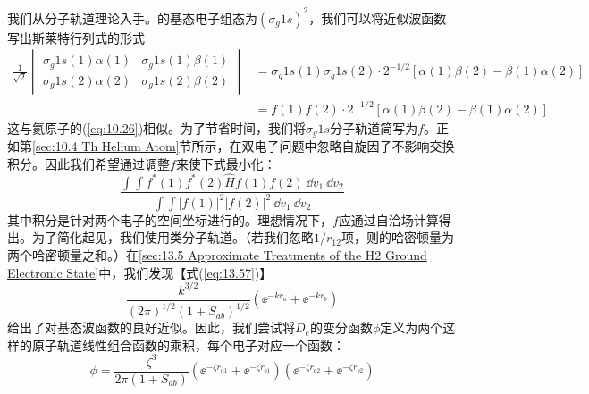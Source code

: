     我们从分子轨道理论入手。的基态电子组态为$\left(\sigma_g 1s\right)^2$，我们可以将近似波函数写出斯莱特行列式的形式
    \begin{equation}
        \begin{aligned}
            \frac{1}{\sqrt{2}}\begin{vmatrix}
                \sigma_g 1s\left(1\right)\alpha\left(1\right) & \sigma_g 1s\left(1\right)\beta\left(1\right) \\
                \sigma_g 1s\left(2\right)\alpha\left(2\right) & \sigma_g 1s\left(2\right)\beta\left(2\right)
            \end{vmatrix} &= \sigma_g 1s\left(1\right)\sigma_g 1s\left(2\right)\cdot2^{-1/2}\left[\alpha\left(1\right)\beta\left(2\right) - \beta\left(1\right)\alpha\left(2\right)\right] \\
            &= f\left(1\right)f\left(2\right)\cdot2^{-1/2}\left[\alpha\left(1\right)\beta\left(2\right)-\beta\left(1\right)\alpha\left(2\right)\right]
        \end{aligned}
        \label{eq:13.92}
    \end{equation}
    这与氦原子的(\ref{eq:10.26})相似。为了节省时间，我们将$\sigma_g 1s$分子轨道简写为$f$。正如第\ref{sec:10.4 Th Helium Atom}节所示，在双电子问题中忽略自旋因子不影响交换积分。因此我们希望通过调整$f$来使下式最小化：
    \begin{equation*}
        \frac{
            \int \int f^*\left(1\right) f^*\left(2\right) \hat{H} f\left(1\right) f\left(2\right) \:\dd v_1\:\dd v_2
        }{
            \int \int \left|f\left(1\right)\right|^2 \left|f\left(2\right)\right|^2 \:\dd v_1\:\dd v_2
        }
    \end{equation*}
    其中积分是针对两个电子的空间坐标进行的。理想情况下，$f$应通过自洽场计算得出。为了简化起见，我们使用类分子轨道。（若我们忽略$1/r_{12}$项，则的哈密顿量为两个哈密顿量之和。）在\ref{sec:13.5 Approximate Treatments of the H2 Ground Electronic State}中，我们发现【式(\ref{eq:13.57})】
    \begin{equation*}
        \frac{k^{3/2}}{(2\pi)^{1/2}(1+S_{ab})^{1/2}}\left(\ee ^{-k r_a}+\ee ^{-k r_b}\right)
    \end{equation*}
    给出了对基态波函数的良好近似。因此，我们尝试将$D_e$的变分函数$\phi$定义为两个这样的原子轨道线性组合函数的乘积，每个电子对应一个函数：
    \begin{equation}
        \phi = \frac{\zeta^3}{2\pi (1 + S_{ab})} \left(\ee ^{-\zeta r_{a1}} + \ee ^{-\zeta r_{b1}} \right) \left(\ee ^{-\zeta r_{a2}} + \ee ^{-\zeta r_{b2}} \right)
        \label{eq:13.93}
    \end{equation}
